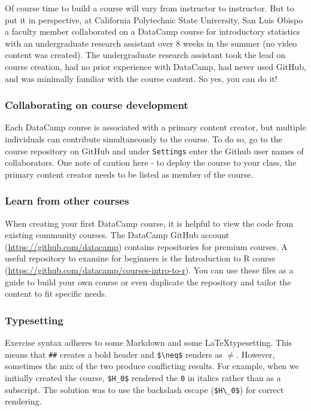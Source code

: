 \documentclass{tise_style_doi}
\begin{document}
Of course time to build a course will vary from instructor to instructor.  But to
put it in perspective, at California Polytechnic State University, San Luis Obispo a faculty
member collaborated on a DataCamp course for introductory statistics with an 
undergraduate research assistant over 8 weeks in the summer (no video content
was created).  The undergraduate research assistant took the lead on course creation, 
had no prior experience with DataCamp, had never used GitHub, and was minimally 
familiar with the course content. So yes, you can do it!

\subsubsection{Collaborating on course development}

Each DataCamp course is associated with a primary content creator, but multiple individuals 
can contribute simultaneously to the course.  To do so, go to the course repository on GitHub 
and under \texttt{Settings} enter the Github user names of collaborators. One note of caution 
here - to deploy the course to your class, the primary content creator needs to be listed 
as member of the course. 

\subsubsection{Learn from other courses}

When creating your first DataCamp course, it is helpful to view the code from existing
community courses. The DataCamp GitHub account (\url{https://github.com/datacamp}) 
contains repositories for premium courses.  A useful repository to examine for
beginners is the Introduction to R course (\url{https://github.com/datacamp/courses-intro-to-r}).
You can use these files as a guide to build your own course or even duplicate the repository 
and tailor the content to fit specific needs.

\subsubsection{Typesetting}

Exercise syntax adheres to some Markdown and some \LaTeX typesetting.  This means that 
\texttt{\#\#} creates a bold header and \verb|$\neq$| renders as \texttt{$\neq$}. However,
sometimes the mix of the two produce conflicting results.  For example, when we initially
created the course, \verb|$H_0$| rendered the \texttt{0} in italics rather than as
a subscript.  The solution was to use the backslash escape (\verb|$H\_0$|) for 
correct rendering.  
\end{document}
